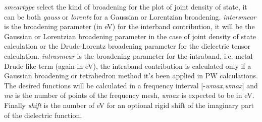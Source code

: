 \documentclass[twocolumn]{article}
\begin{document}
\emph{smeartype} select the kind of broadening for the plot of joint density of state, it can be both
\emph{gauss} or \emph{lorentz} for a Gaussian or Lorentzian broadening. \emph{intersmear} is the broadening 
parameter (in eV) for the interband contribution,
it will be the Gaussian or Lorentzian broadening parameter in the case of joint density of state calculation or the
Drude-Lorentz broadening parameter for the dielectric tensor calculation.
\emph{intrasmear} is the broadening parameter for the intraband, i.e. metal Drude like term (again in eV), 
the intraband contribution is calculated only if a Gaussian broadening or tetrahedron method it's been 
applied in PW calculations.    
The desired functions will be calculated in a frequency interval $\big[$-\emph{wmax},\emph{wmax}$\big]$ and \emph{nw}
is the number of points of the frequency mesh, \emph{wmax} is expected to be in eV. Finally \emph{shift} is the number
of eV for an optional rigid shift of the imaginary part of the dielectric function.
\end{document}
